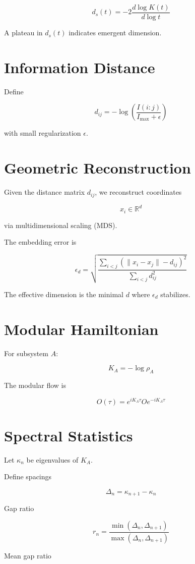 \documentclass[11pt,a4paper]{article}
\begin{document}
\[
d_s(t)=-2\frac{d\log K(t)}{d\log t}
\]

A plateau in $d_s(t)$ indicates emergent dimension.

\section{Information Distance}

Define

\[
d_{ij}=-\log\left(\frac{I(i:j)}{I_{\max}+\epsilon}\right)
\]

with small regularization $\epsilon$.

\section{Geometric Reconstruction}

Given the distance matrix $d_{ij}$, we reconstruct coordinates

\[
x_i \in \mathbb{R}^d
\]

via multidimensional scaling (MDS).

The embedding error is

\[
\epsilon_d =
\sqrt{
\frac{
\sum_{i<j}(\|x_i-x_j\|-d_{ij})^2
}{
\sum_{i<j}d_{ij}^2
}}
\]

The effective dimension is the minimal $d$ where $\epsilon_d$ stabilizes.

\section{Modular Hamiltonian}

For subsystem $A$:

\[
K_A = -\log \rho_A
\]

The modular flow is

\[
O(\tau) = e^{iK_A\tau} O e^{-iK_A\tau}
\]

\section{Spectral Statistics}

Let $\kappa_n$ be eigenvalues of $K_A$.

Define spacings

\[
\Delta_n = \kappa_{n+1}-\kappa_n
\]

Gap ratio

\[
r_n=
\frac{\min(\Delta_n,\Delta_{n+1})}
{\max(\Delta_n,\Delta_{n+1})}
\]

Mean gap ratio
\end{document}

